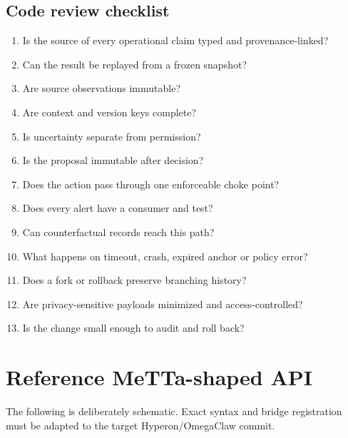 \documentclass[11pt,oneside]{report}
\begin{document}
\section{Code review checklist}

\begin{enumerate}
  \item Is the source of every operational claim typed and provenance-linked?
  \item Can the result be replayed from a frozen snapshot?
  \item Are source observations immutable?
  \item Are context and version keys complete?
  \item Is uncertainty separate from permission?
  \item Is the proposal immutable after decision?
  \item Does the action pass through one enforceable choke point?
  \item Does every alert have a consumer and test?
  \item Can counterfactual records reach this path?
  \item What happens on timeout, crash, expired anchor or policy error?
  \item Does a fork or rollback preserve branching history?
  \item Are privacy-sensitive payloads minimized and access-controlled?
  \item Is the change small enough to audit and roll back?
\end{enumerate}

\appendix

\chapter{Reference MeTTa-shaped API}

The following is deliberately schematic. Exact syntax and bridge registration must be adapted to the target Hyperon/OmegaClaw commit.
\end{document}
